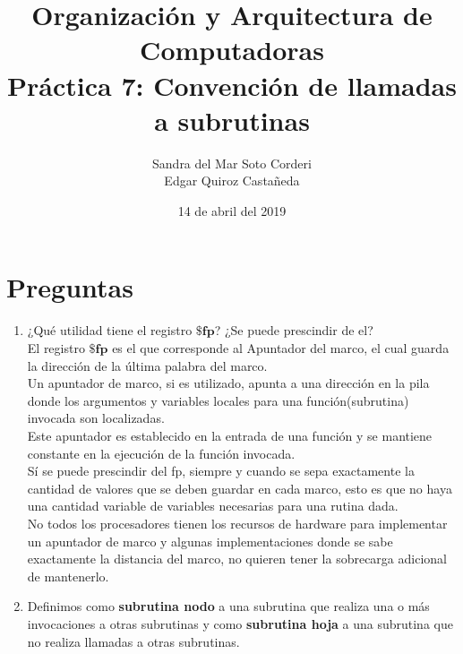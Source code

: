 \documentclass{article}
\begin{document}
    \title{
        Organización y Arquitectura de Computadoras \\
        Práctica 7: Convención de llamadas a subrutinas \\
    }
    \date{
        14 de abril del 2019
    }
    \author{
        Sandra del Mar Soto Corderi \\
        Edgar Quiroz Castañeda
    }
    \maketitle

    \section{Preguntas}
    \begin{enumerate}
    
    \item {
    ¿Qué utilidad tiene el registro $\textbf{\$fp}$? ¿Se puede prescindir de el?\\
    
	El registro $\textbf{\$fp}$ es el que corresponde al Apuntador del marco, 
	el cual guarda la dirección de la última palabra del marco. \\
	Un apuntador de marco, si es utilizado, apunta a una dirección en la pila 
	donde los argumentos y variables locales para una función(subrutina) 
	invocada son localizadas. \\
	Este apuntador es establecido en la entrada de una función y se mantiene 
	constante en la ejecución de la función invocada.\\
	
	Sí se puede prescindir del fp, siempre y cuando se sepa exactamente la
	cantidad de valores que se deben guardar en cada marco, esto es que no haya
	una cantidad variable de variables necesarias para una rutina dada. \\
	No todos los procesadores tienen los recursos de hardware para implementar 
	un apuntador de marco y algunas implementaciones donde se sabe exactamente 
	la distancia del marco, no quieren tener la sobrecarga adicional de 
	mantenerlo.\\
	}

	\item {
	Definimos como \textbf{subrutina nodo} a una subrutina que realiza una o más
	invocaciones a otras subrutinas y como \textbf{subrutina hoja} a una subrutina
	que no realiza llamadas a otras subrutinas. \\
	
}
\end{enumerate}
\end{document}
